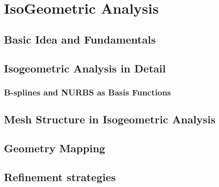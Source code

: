 \section{IsoGeometric Analysis}

\subsection{Basic Idea and Fundamentals}

\subsection{Isogeometric Analysis in Detail}

\subsubsection{B-splines and NURBS as Basis Functions}

\subsection{Mesh Structure in Isogeometric Analysis}

\subsection{Geometry Mapping}

\subsection{Refinement strategies}